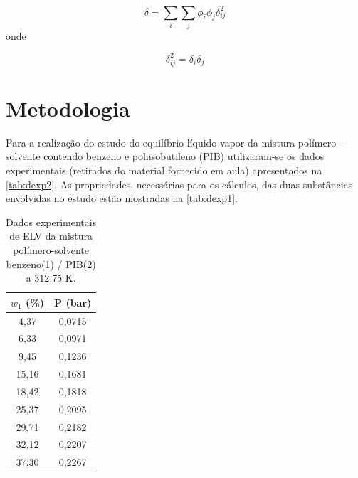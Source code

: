 \begin{equation}\label{eq:delta}
\delta = \sum_i\sum_j\phi_i\phi_j\delta_{ij}^2
\end{equation}
onde

\begin{equation}\label{eq:deltaij}
\delta_{ij}^2 = \delta_i\delta_j
\end{equation}



\section{Metodologia}

Para a realização do estudo do equilíbrio líquido-vapor da mistura
polímero - solvente contendo benzeno e poliisobutileno (PIB) utilizaram-se 
os dados experimentais (retirados do material fornecido em aula) apresentados na
\autoref{tab:dexp2}. As propriedades, necessárias para os cálculos, das duas
substâncias envolvidas no estudo estão mostradas na \autoref{tab:dexp1}.

\begin{table}[htb]
\renewcommand{\arraystretch}{1.3}
\centering
\caption{Dados experimentais de ELV da mistura polímero-solvente benzeno(1) /
PIB(2) a 312,75 K.}
\begin{tabular}{S[table-format=2.2,round-mode=places,round-precision=2]
S[table-format=1.4,round-mode=places,round-precision=4]}
\toprule
{$w_1$ (\%)}	&	{P (bar)}	\\
\midrule

4,37	&	0,0715	\\
6,33	&	0,0971	\\
9,45	&	0,1236	\\
15,16	&	0,1681	\\
18,42	&	0,1818	\\
25,37	&	0,2095	\\
29,71	&	0,2182	\\
32,12	&	0,2207	\\
37,30	&	0,2267	\\
\bottomrule
\end{tabular}
\label{tab:dexp2} 
\end{table} 

